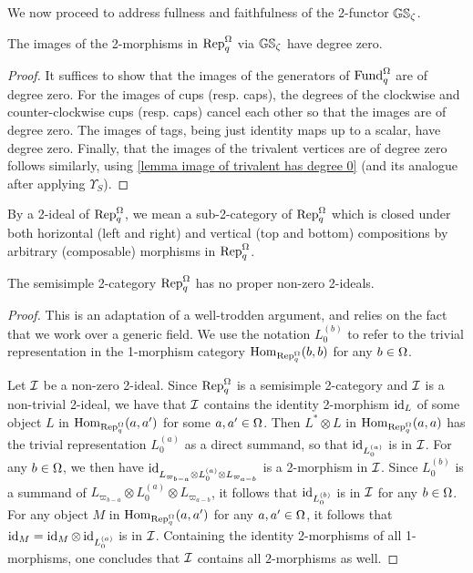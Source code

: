 We now proceed to address fullness and faithfulness of the 2-functor $\mathbb{GS}_\zeta$.

\begin{lemma}
   The images of the 2-morphisms in $\operatorname{Rep}_q^{\Omega}$ via $\mathbb{GS}_\zeta$ have degree zero.
\end{lemma}
\begin{proof}
    It suffices to show that the images of the generators of $\operatorname{Fund}_q^{\Omega}$ are of degree zero. For the images of cups (resp. caps), the degrees of the clockwise and counter-clockwise cups (resp. caps) cancel each other so that the images are of degree zero.
    The images of tags, being just identity maps up to a scalar, have degree zero.
    Finally, that the images of the trivalent vertices are of degree zero follows similarly, using \cref{lemma image of trivalent has degree 0} (and its analogue after applying $\Upsilon_S$).
\end{proof}

By a 2-ideal of $\operatorname{Rep}_q^{\Omega}$, we mean a sub-2-category of $\operatorname{Rep}_q^{\Omega}$ which is closed under both horizontal (left and right) and vertical (top and bottom) compositions by arbitrary (composable) morphisms in $\operatorname{Rep}_q^{\Omega}$.

\begin{lemma}\label{lemma monoidal ideals in qRep}
    The semisimple 2-category $\operatorname{Rep}_q^{\Omega}$ has no proper non-zero 2-ideals.
\end{lemma}

\begin{proof}
   This is an adaptation of a well-trodden argument, and relies on the fact that we work over a generic field. We use the notation $L_0^{(b)}$ to refer to the trivial representation in the 1-morphism category $\operatorname{Hom}_{\operatorname{Rep}_q^{\Omega}}(b,b)$ for any $b \in \Omega$.
   
   Let $\mathcal{I}$ be a non-zero 2-ideal.  
   Since $\operatorname{Rep}_q^{\Omega}$ is a semisimple 2-category and $\mathcal{I}$ is a non-trivial 2-ideal, we have that $\mathcal{I}$ contains the identity 2-morphism $\operatorname{id}_L$ of some object $L$ in $\operatorname{Hom}_{\operatorname{Rep}_q^{\Omega}}(a,a')$ for some $a,a' \in \Omega$. 
   Then $L^*\otimes L$ in $\operatorname{Hom}_{\operatorname{Rep}_q^{\Omega}}(a,a)$ has the trivial representation $L_0^{(a)}$ as a direct summand, so that $\operatorname{id}_{L_0^{(a)}}$ is in $\mathcal{I}$.
   For any $b \in \Omega$, we then have $\operatorname{id}_{L_{\varpi_{b-a}}\otimes L_0^{(a)} \otimes L_{\varpi_{a-b}}}$ is a 2-morphism in $\mathcal{I}$. 
   Since $L_0^{(b)}$ is a summand of $L_{\varpi_{b-a}}\otimes L_0^{(a)} \otimes L_{\varpi_{a-b}}$, it follows that $\operatorname{id}_{L_0^{(b)}}$ is in $\mathcal{I}$ for any $b \in \Omega$. For any object $M$ in $\operatorname{Hom}_{\operatorname{Rep}_q^{\Omega}}(a,a')$ for any $a,a' \in \Omega$, it follows that $\operatorname{id}_M = \operatorname{id}_M \otimes \operatorname{id}_{L_0^{(a)}}$ is in $\mathcal{I}$. Containing the identity 2-morphisms of all 1-morphisms, one concludes that $\mathcal{I}$ contains all $2$-morphisms as well.
\end{proof}


